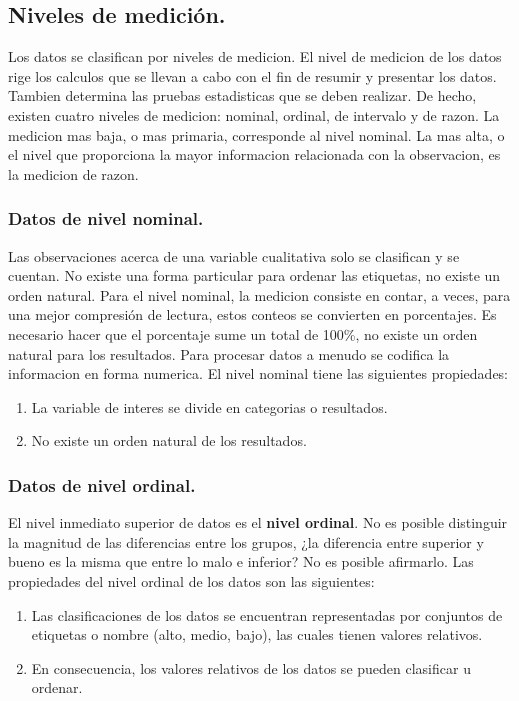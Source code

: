 \documentclass[]{article}
\begin{document}
\subsection{Niveles de medición.}
Los datos se clasifican por niveles de medicion. El nivel de medicion de los datos rige los calculos que se llevan a cabo con el fin de resumir y presentar los datos. Tambien determina las pruebas estadisticas que se deben realizar. De hecho, existen cuatro niveles de medicion: nominal, ordinal, de intervalo y de razon. La medicion mas baja, o mas primaria, corresponde al nivel nominal. La mas alta, o el nivel que proporciona la mayor informacion relacionada con la observacion, es la medicion de razon.

\subsubsection*{Datos de nivel nominal.}
Las observaciones acerca de una variable cualitativa solo se clasifican y se cuentan. No existe una forma particular para ordenar las etiquetas, no existe un orden natural. Para el nivel nominal, la medicion consiste en contar, a veces, para una mejor compresión de lectura, estos conteos se convierten en porcentajes. Es necesario hacer que el porcentaje sume un total de 100\%, no existe un orden natural para los resultados. Para procesar datos a menudo se codifica la informacion en forma numerica. El nivel nominal tiene las siguientes propiedades:
\begin{enumerate}
	\item La variable de interes se divide en categorias o resultados.
	\item No existe un orden natural de los resultados.
\end{enumerate}

\subsubsection*{Datos de nivel ordinal.}
El nivel inmediato superior de datos es el \textbf{nivel ordinal}. No es posible distinguir la magnitud de las diferencias entre los grupos, ¿la diferencia entre superior y bueno es la misma que entre lo malo e inferior? No es posible afirmarlo. Las propiedades del nivel ordinal de los datos son las siguientes:
\begin{enumerate}
	\item Las clasificaciones de los datos se encuentran representadas por conjuntos de etiquetas o nombre (alto, medio, bajo), las cuales tienen valores relativos.
	\item En consecuencia, los valores relativos de los datos se pueden clasificar u ordenar.
\end{enumerate}
\end{document}
